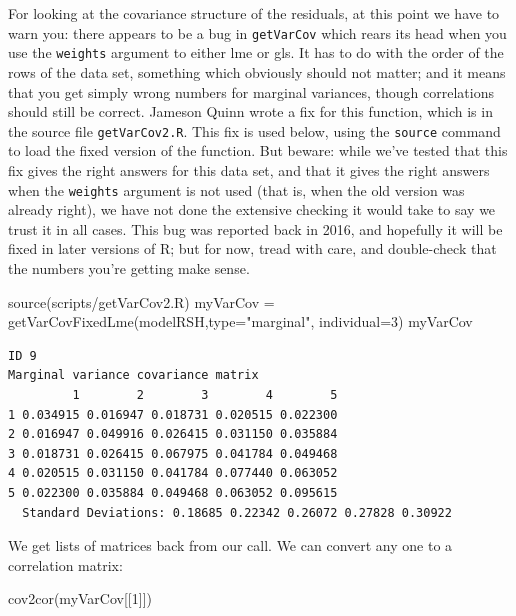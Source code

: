 \documentclass[
  letterpaper,
  DIV=11,
  numbers=noendperiod]{scrreprt}
\newenvironment{Shaded}{\begin{snugshade}}{\end{snugshade}}
\newcommand{\AttributeTok}[1]{\textcolor[rgb]{0.49,0.56,0.16}{#1}}
\newcommand{\DecValTok}[1]{\textcolor[rgb]{0.25,0.63,0.44}{#1}}
\newcommand{\FunctionTok}[1]{\textcolor[rgb]{0.02,0.16,0.49}{#1}}
\newcommand{\NormalTok}[1]{\textcolor[rgb]{0.00,0.44,0.13}{#1}}
\newcommand{\OtherTok}[1]{\textcolor[rgb]{0.00,0.44,0.13}{#1}}
\newcommand{\StringTok}[1]{\textcolor[rgb]{0.25,0.44,0.63}{#1}}
\begin{document}
For looking at the covariance structure of the residuals, at this point
we have to warn you: there appears to be a bug in \texttt{getVarCov}
which rears its head when you use the \texttt{weights} argument to
either lme or gls. It has to do with the order of the rows of the data
set, something which obviously should not matter; and it means that you
get simply wrong numbers for marginal variances, though correlations
should still be correct. Jameson Quinn wrote a fix for this function,
which is in the source file \texttt{getVarCov2.R}. This fix is used
below, using the \texttt{source} command to load the fixed version of
the function. But beware: while we've tested that this fix gives the
right answers for this data set, and that it gives the right answers
when the \texttt{weights} argument is not used (that is, when the old
version was already right), we have not done the extensive checking it
would take to say we trust it in all cases. This bug was reported back
in 2016, and hopefully it will be fixed in later versions of R; but for
now, tread with care, and double-check that the numbers you're getting
make sense.

\begin{Shaded}
\begin{Highlighting}[]
\FunctionTok{source}\NormalTok{(}\StringTok{\textquotesingle{}scripts/getVarCov2.R\textquotesingle{}}\NormalTok{)}
\NormalTok{myVarCov }\OtherTok{=} \FunctionTok{getVarCovFixedLme}\NormalTok{(modelRSH,}\AttributeTok{type=}\StringTok{"marginal"}\NormalTok{, }\AttributeTok{individual=}\DecValTok{3}\NormalTok{)}
\NormalTok{myVarCov}
\end{Highlighting}
\end{Shaded}

\begin{verbatim}
ID 9 
Marginal variance covariance matrix
         1        2        3        4        5
1 0.034915 0.016947 0.018731 0.020515 0.022300
2 0.016947 0.049916 0.026415 0.031150 0.035884
3 0.018731 0.026415 0.067975 0.041784 0.049468
4 0.020515 0.031150 0.041784 0.077440 0.063052
5 0.022300 0.035884 0.049468 0.063052 0.095615
  Standard Deviations: 0.18685 0.22342 0.26072 0.27828 0.30922 
\end{verbatim}

We get lists of matrices back from our call. We can convert any one to a
correlation matrix:

\begin{Shaded}
\begin{Highlighting}[]
\FunctionTok{cov2cor}\NormalTok{(myVarCov[[}\DecValTok{1}\NormalTok{]])}
\end{Highlighting}
\end{Shaded}
\end{document}
